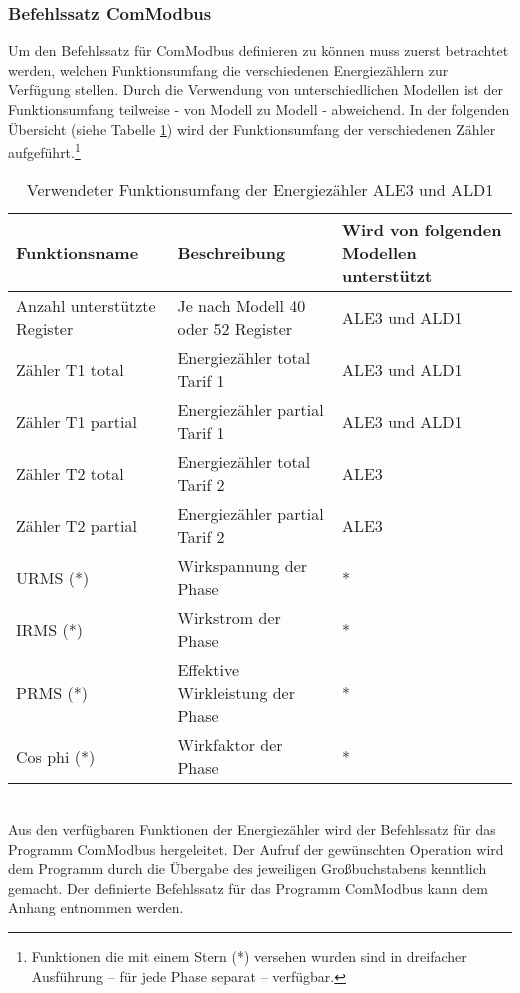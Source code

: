 \documentclass[Bachelorarbeit.tex]{subfiles}
\begin{document}
\subsubsection*{Befehlssatz ComModbus}
Um den Befehlssatz für ComModbus definieren zu können muss zuerst betrachtet werden, welchen Funktionsumfang die verschiedenen Energiezählern zur Verfügung stellen. Durch die 
Verwendung von unterschiedlichen Modellen ist der 
Funktionsumfang teilweise - von Modell zu Modell - abweichend. In der folgenden Übersicht (siehe 
Tabelle \ref{tab:funkion_zaehler}) wird der Funktionsumfang der verschiedenen Zähler aufgeführt.\footnote{Funktionen die mit 
einem Stern (*) versehen wurden sind in dreifacher Ausführung – für jede Phase separat – verfügbar.} 


\begin{table} [h]
\begin{tabular}{|m{25ex}|m{25ex}|m{25ex}|}
\hline \textbf{Funktionsname} &  \textbf{Beschreibung} & \textbf{Wird von folgenden Modellen unterstützt} \\ 
\hline 
\rule[-0ex]{0pt}{2.5ex}Anzahl unterstützte Register & Je nach Modell 40 oder 52 Register & \acs{ALE3} und \acs{ALD1} \\ 
\hline 
\rule[-0ex]{0pt}{2.5ex}Zähler T1 total & Energiezähler total Tarif 1 & \acs{ALE3} und \acs{ALD1} \\ 
\hline Zähler T1 partial  & Energiezähler partial Tarif 1 & \acs{ALE3} und \acs{ALD1} \\ 
\hline Zähler T2 total  & Energiezähler total Tarif 2  & \acs{ALE3} \\ 
\hline Zähler T2 partial & Energiezähler partial Tarif 2 & \acs{ALE3} \\ 
\hline URMS (*) & Wirkspannung der Phase & * \\ 
\hline IRMS (*) & Wirkstrom der Phase & * \\ 
\hline PRMS (*) & Effektive Wirkleistung der Phase & * \\ 
\hline Cos phi (*) & Wirkfaktor der Phase & * \\ 
\hline 
\end{tabular} 
\caption{Verwendeter Funktionsumfang der Energiezähler ALE3 und ALD1 \parencites[vgl.][]{datenblatt_ald1}[und][]{datenblatt_ale3}}
\label{tab:funkion_zaehler}
\end{table}
\mbox{}\\
Aus den verfügbaren Funktionen der Energiezähler wird der Befehlssatz für das 
Programm ComModbus hergeleitet. Der Aufruf der gewünschten Operation wird dem Programm durch die Übergabe des jeweiligen Großbuchstabens kenntlich 
gemacht. Der definierte Befehlssatz für das Programm ComModbus kann dem Anhang entnommen werden. 
\end{document}
